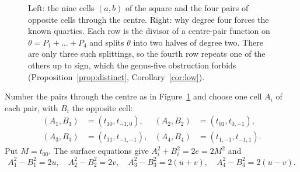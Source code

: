 \documentclass[11pt]{amsart}
\theoremstyle{definition}
\begin{document}
\begin{figure}[t]
\centering
{}
\caption{Left: the nine cells $(a,b)$ of the square and the four pairs of opposite cells through the centre. Right:
why degree four forces the known quartics. Each row is the divisor of a centre-pair function on $\theta=P_1+\dots+P_4$
and splits $\theta$ into two halves of degree two. There are only three such splittings, so the fourth row repeats one
of the others up to sign, which the genus-five obstruction forbids (Proposition~\ref{prop:distinct},
Corollary~\ref{cor:low}).}
\label{fig:grid}
\end{figure}

Number the pairs through the centre as in Figure~\ref{fig:grid} and choose one cell $A_i$ of each pair, with $B_i$
the opposite cell:
\begin{align*}
(A_1,B_1)&=(t_{10},t_{-1,0}), & (A_2,B_2)&=(t_{01},t_{0,-1}),\\
(A_3,B_3)&=(t_{11},t_{-1,-1}), & (A_4,B_4)&=(t_{1,-1},t_{-1,1}).
\end{align*}
Put $M=t_{00}$. The surface equations give $A_i^2+B_i^2=2e=2M^2$ and
\[
A_1^2-B_1^2=2u,\quad A_2^2-B_2^2=2v,\quad A_3^2-B_3^2=2(u+v),\quad A_4^2-B_4^2=2(u-v).
\]
\end{document}
